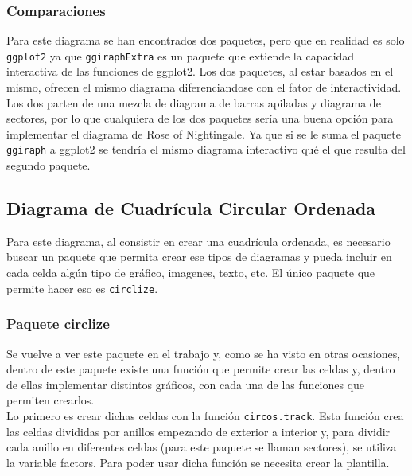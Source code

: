 \documentclass{article}\usepackage[]{graphicx}\usepackage[]{color}
\begin{document}
\subsubsection{Comparaciones}
Para este diagrama se han encontrados dos paquetes, pero que en realidad es solo \texttt{ggplot2} ya que \texttt{ggiraphExtra} es un paquete que extiende la capacidad interactiva de las funciones de ggplot2. Los dos paquetes, al estar basados en el mismo, ofrecen el mismo diagrama diferenciandose con el fator de interactividad. Los dos parten de una mezcla de diagrama de barras apiladas y diagrama de sectores, por lo que cualquiera de los dos paquetes ser\'ia una buena opci\'on para implementar el diagrama de Rose of Nightingale. Ya que si se le suma el paquete \texttt{ggiraph} a ggplot2 se tendr\'ia el mismo diagrama interactivo qu\'e el que resulta del segundo paquete.
\clearpage
\subsection{Diagrama de Cuadr\'icula Circular Ordenada}\label{ssec:ord}
Para este diagrama, al consistir en crear una cuadr\'icula ordenada, es necesario buscar un paquete que permita crear ese tipos de diagramas y pueda incluir en cada celda alg\'un tipo de gr\'afico, imagenes, texto, etc. El \'unico paquete que permite hacer eso es \texttt{circlize}.
\subsubsection{Paquete circlize}
Se vuelve a ver este paquete \cite{docu_circlize}
en el trabajo y, como se ha visto en otras ocasiones, dentro de este paquete existe una funci\'on que permite crear las celdas y, dentro de ellas implementar distintos gr\'aficos, con cada una de las funciones que permiten crearlos.~\\
Lo primero es crear dichas celdas con la funci\'on \texttt{circos.track}. Esta funci\'on crea las celdas divididas por anillos empezando de exterior a interior y, para dividir cada anillo en diferentes celdas (para este paquete se llaman sectores), se utiliza la variable factors. Para poder usar dicha funci\'on se necesita crear la plantilla.~\\
\end{document}
